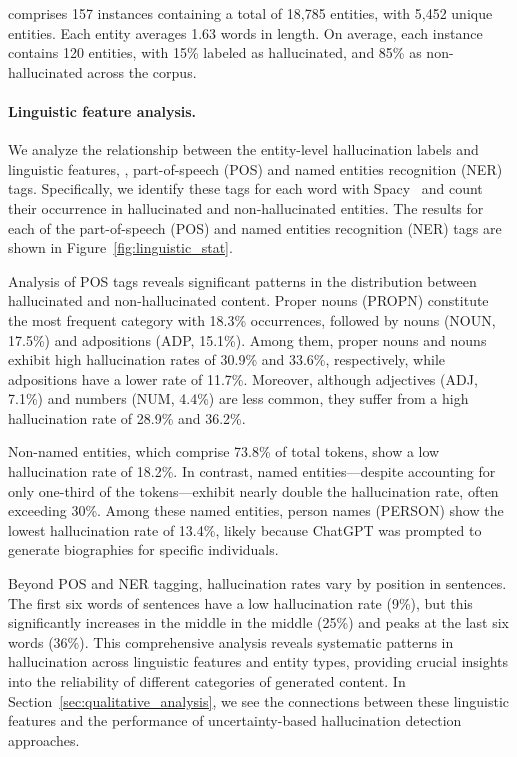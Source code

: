 \dataset comprises 157 instances containing a total of 18,785 entities, with 5,452 unique entities. Each entity averages 1.63 words in length. On average, each instance contains 120 entities, with 15\% labeled as hallucinated, and 85\% as non-hallucinated across the corpus. 


\paragraph{Linguistic feature analysis.}
We analyze the relationship between the entity-level hallucination labels and linguistic features, \eg, part-of-speech (POS) and named entities recognition (NER) tags. Specifically, we identify these tags for each word with Spacy~\citep{spacy2} and count their occurrence in hallucinated and non-hallucinated entities. The results for each of the part-of-speech (POS) and 
 named entities recognition (NER) tags are shown in Figure~\ref{fig:linguistic_stat}.


Analysis of POS tags reveals significant patterns in the distribution between hallucinated and non-hallucinated content. Proper nouns (PROPN) constitute the most frequent category with 18.3\% occurrences, followed by nouns (NOUN, 17.5\%) and adpositions (ADP, 15.1\%). Among them, proper nouns and nouns exhibit high hallucination rates of 30.9\% and 33.6\%, respectively, while adpositions have a lower rate of 11.7\%. Moreover, although adjectives (ADJ, 7.1\%) and numbers (NUM, 4.4\%) are less common, they suffer from a high hallucination rate of 28.9\% and 36.2\%. 

Non-named entities, which comprise 73.8\% of total tokens, show a low hallucination rate of 18.2\%. In contrast, named entities---despite accounting for only one-third of the tokens—exhibit nearly double the hallucination rate, often exceeding 30\%. Among these named entities, person names (PERSON) show the lowest hallucination rate of 13.4\%, likely because ChatGPT was prompted to generate biographies for specific individuals.

Beyond POS and NER tagging, hallucination rates vary by position in sentences. The first six words of sentences have a low hallucination rate (9\%), but this significantly increases in the middle in the middle (25\%) and peaks at the last six words (36\%). This comprehensive analysis reveals systematic patterns in hallucination across linguistic features and entity types, providing crucial insights into the reliability of different categories of generated content. In Section~\ref{sec:qualitative_analysis}, we see the connections between these linguistic features and the performance of uncertainty-based hallucination detection approaches.

